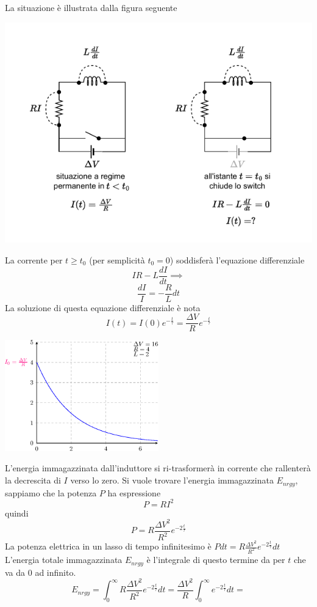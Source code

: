\documentclass[10pt, letterpaper]{report}
\begin{document}
La situazione è illustrata dalla figura seguente\begin{center}
    \includegraphics[width=\textwidth]{images/circuitoRL2.pdf}
\end{center}
La corrente per $t\ge t_0$ (per semplicità $t_0=0$) soddisferà l'equazione differenziale 
$$ IR-L\frac{dI}{dt}\implies$$
$$ \frac{dI}{I}=-\frac{R}{L}dt$$
La soluzione di questa equazione differenziale è nota 
$$ I(t)=I(0)e^{-\frac{t}{\tau}}=\frac{\Delta V}{R}e^{-\frac{t}{\tau}}$$\begin{center}
    \includegraphics[width=0.5\textwidth]{images/correnteRL2.eps}
\end{center}
L'energia immagazzinata dall'induttore si ri-trasformerà in corrente che rallenterà la decrescita di $I$ verso lo zero.\acc 
Si vuole trovare l'energia immagazzinata $E_{nrgy}$, sappiamo che la potenza $P$ ha espressione 
$$ P=RI^2$$
quindi 
$$ P=R\frac{\Delta V^2}{R^2}e^{-2\frac{t}{\tau}}$$
La potenza elettrica in un lasso di tempo infinitesimo è $Pdt=R\frac{\Delta V^2}{R^2}e^{-2\frac{t}{\tau}}dt$
L'energia totale immagazzinata $E_{nrgy}$ è l'integrale di questo termine da per $t$ che va da 0 ad infinito. 
$$E_{nrgy}=\int_0^\infty R\frac{\Delta V^2}{R^2}e^{-2\frac{t}{\tau}}dt = 
\frac{\Delta V^2}{R}\int_0^\infty e^{-2\frac{t}{\tau}}dt=$$
\end{document}
